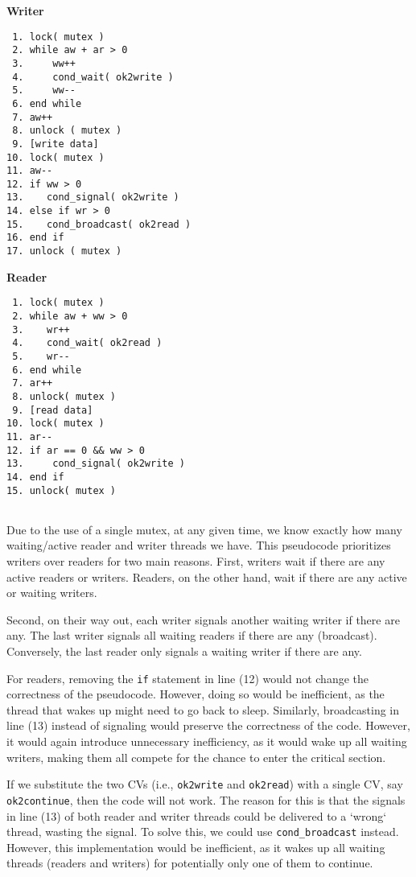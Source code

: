 \begin{multicols}{2}
    \textbf{Writer}\vspace{-2em}
    \begin{verbatim}
 1. lock( mutex )
 2. while aw + ar > 0
 3.     ww++
 4.     cond_wait( ok2write )
 5.     ww--
 6. end while
 7. aw++
 8. unlock ( mutex )
 9. [write data]
10. lock( mutex )
11. aw--
12. if ww > 0
13.    cond_signal( ok2write )
14. else if wr > 0
15.    cond_broadcast( ok2read )
16. end if
17. unlock ( mutex )
    \end{verbatim}
    \columnbreak
    \textbf{Reader}\vspace{-2em}
    \begin{verbatim}
 1. lock( mutex )
 2. while aw + ww > 0
 3.    wr++
 4.    cond_wait( ok2read )
 5.    wr--
 6. end while
 7. ar++
 8. unlock( mutex )
 9. [read data]
10. lock( mutex )
11. ar--
12. if ar == 0 && ww > 0
13.     cond_signal( ok2write )
14. end if
15. unlock( mutex )


    \end{verbatim}
\end{multicols}
\vspace{-2em}


Due to the use of a single mutex, at any given time, we know exactly how many waiting/active reader and writer threads we have.
This pseudocode prioritizes writers over readers for two main reasons.
First, writers wait if there are any active readers or writers.
Readers, on the other hand, wait if there are any active or waiting writers.

Second, on their way out, each writer signals another waiting writer if there are any.
The last writer signals all waiting readers if there are any (broadcast).
Conversely, the last reader only signals a waiting writer if there are any.

For readers, removing the \texttt{if} statement in line (12) would not change the correctness of the pseudocode.
However, doing so would be inefficient, as the thread that wakes up might need to go back to sleep.
Similarly, broadcasting in line (13) instead of signaling would preserve the correctness of the code.
However, it would again introduce unnecessary inefficiency, as it would wake up all waiting writers, making them all compete for the chance to enter the critical section.

If we substitute the two CVs (i.e., \texttt{ok2write} and \texttt{ok2read}) with a single CV, say \texttt{ok2continue}, then the code will not work.
The reason for this is that the signals in line (13) of both reader and writer threads could be delivered to a `wrong` thread, wasting the signal.
To solve this, we could use \texttt{cond\_broadcast} instead.
However, this implementation would be inefficient, as it wakes up all waiting threads (readers and writers) for potentially only one of them to continue.


